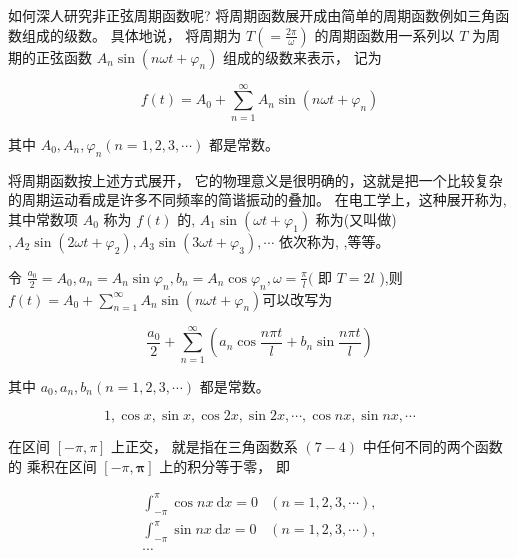 如何深人研究非正弦周期函数呢? 将周期函数展开成由简单的周期函数例如三角函数组成的级数。 具体地说， 将周期为 $ T\left(=\frac{2 \pi}{\omega}\right) $ 的周期函数用一系列以 $ T $ 为周 期的正弦函数 $ A_{n} \sin \left(n \omega t+\varphi_{n}\right) $ 组成的级数来表示， 记为

\begin{equation} f(t)=A_{0}+\sum_{n=1}^{\infty} A_{n} \sin \left(n \omega t+\varphi_{n}\right) \end{equation}

其中 $ A_{0}, A_{n}, \varphi_{n}(n=1,2,3, \cdots) $ 都是常数。

将周期函数按上述方式展开， 它的物理意义是很明确的，这就是把一个比较复杂的周期运动看成是许多不同频率的简谐振动的叠加。 在电工学上，这种展开称为,其中常数项 $ A_{0} $ 称为 $ f(t) $ 的, $ A_{1} \sin \left(\omega t+\varphi_{1}\right) $ 称为(又叫做) $ , A_{2} \sin \left(2 \omega t+\varphi_{2}\right), A_{3} \sin \left(3 \omega t+\varphi_{3}\right), \cdots $ 依次称为, ,等等。

\begin{definition}[三角级数]
    令 $ \frac{a_{0}}{2}=A_{0}, a_{n}=A_{n} \sin \varphi_{n}, b_{n}=A_{n} \cos \varphi_{n}, \omega=\frac{\pi}{l}( $ 即 $ T=2 l $ ),则$ f(t)=A_{0}+\sum_{n=1}^{\infty} A_{n} \sin \left(n \omega t+\varphi_{n}\right) $可以改写为

    \begin{equation} \frac{a_{0}}{2}+\sum_{n=1}^{\infty}\left(a_{n} \cos \frac{n \pi t}{l}+b_{n} \sin \frac{n \pi t}{l}\right) \end{equation}

    其中 $ a_{0}, a_{n}, b_{n}(n=1,2,3, \cdots) $ 都是常数。 
\end{definition}

\begin{definition}[三角函数系（基波）]
    \begin{equation} 1, \cos x, \sin x, \cos 2 x, \sin 2 x, \cdots, \cos n x, \sin n x, \cdots \end{equation}

    在区间 $ [-\pi, \pi] $ 上正交， 就是指在三角函数系 $ (7-4) $ 中任何不同的两个函数的 乘积在区间 $ [-\pi, \boldsymbol{\pi}] $ 上的积分等于零， 即

    \begin{equation} \begin{array}{ll}\int_{-\pi}^{\pi} \cos n x \mathrm{~d} x=0 & (n=1,2,3, \cdots), \\ \int_{-\pi}^{\pi} \sin n x \mathrm{~d} x=0 & (n=1,2,3, \cdots),\\ \cdots
    \end{array} \end{equation}
\end{definition}

